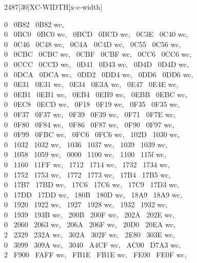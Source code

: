 \begin{worddef}{2487}[30]{XC-WIDTH}[x-c-width]
\begin{implement}
	0 ~0B82 ~0B82 wc,\\
	0 ~0BC0 ~0BC0 wc, ~0BCD ~0BCD wc, ~0C3E ~0C40 wc,\\
	0 ~0C46 ~0C48 wc, ~0C4A ~0C4D wc, ~0C55 ~0C56 wc,\\
	0 ~0CBC ~0CBC wc, ~0CBF ~0CBF wc, ~0CC6 ~0CC6 wc,\\
	0 ~0CCC ~0CCD wc, ~0D41 ~0D43 wc, ~0D4D ~0D4D wc,\\
	0 ~0DCA ~0DCA wc, ~0DD2 ~0DD4 wc, ~0DD6 ~0DD6 wc,\\
	0 ~0E31 ~0E31 wc, ~0E34 ~0E3A wc, ~0E47 ~0E4E wc,\\
	0 ~0EB1 ~0EB1 wc, ~0EB4 ~0EB9 wc, ~0EBB ~0EBC wc,\\
	0 ~0EC8 ~0ECD wc, ~0F18 ~0F19 wc, ~0F35 ~0F35 wc,\\
	0 ~0F37 ~0F37 wc, ~0F39 ~0F39 wc, ~0F71 ~0F7E wc,\\
	0 ~0F80 ~0F84 wc, ~0F86 ~0F87 wc, ~0F90 ~0F97 wc,\\
	0 ~0F99 ~0FBC wc, ~0FC6 ~0FC6 wc, ~102D ~1030 wc,\\
	0 ~1032 ~1032 wc, ~1036 ~1037 wc, ~1039 ~1039 wc,\\
	0 ~1058 ~1059 wc, ~0000 ~1100 wc, ~1100 ~115f wc,\\
	0 ~1160 ~11FF wc, ~1712 ~1714 wc, ~1732 ~1734 wc,\\
	0 ~1752 ~1753 wc, ~1772 ~1773 wc, ~17B4 ~17B5 wc,\\
	0 ~17B7 ~17BD wc, ~17C6 ~17C6 wc, ~17C9 ~17D3 wc,\\
	0 ~17DD ~17DD wc, ~180B ~180D wc, ~18A9 ~18A9 wc,\\
	0 ~1920 ~1922 wc, ~1927 ~1928 wc, ~1932 ~1932 wc,\\
	0 ~1939 ~193B wc, ~200B ~200F wc, ~202A ~202E wc,\\
	0 ~2060 ~2063 wc, ~206A ~206F wc, ~20D0 ~20EA wc,\\
	2 ~2329 ~232A wc, ~302A ~302F wc, ~2E80 ~303E wc,\\
	0 ~3099 ~309A wc, ~3040 ~A4CF wc, ~AC00 ~D7A3 wc,\\
	2 ~F900 ~FAFF wc, ~FB1E ~FB1E wc, ~FE00 ~FE0F wc,\\

\end{implement}
\end{worddef}
